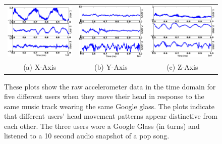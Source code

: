 \begin{figure}[t]
\begin{center}
\begin{tabular}{ccc}
\includegraphics [width=.33\linewidth]{figure/raw_x.eps}&
\includegraphics [width=.33\linewidth]{figure/raw_y.eps}&
\includegraphics [width=.33\linewidth]{figure/raw_z.eps}\\
(a) X-Axis & (b) Y-Axis & (c) Z-Axis \\
\end{tabular}

\end{center}
\caption{\label{fig:raw} These plots show the raw accelerometer data in the
time domain for five different users when they move their head in response to
the same music track wearing the same Google glass. The plots
indicate that different users' head movement patterns appear distinctive from
each other. The three users wore a Google Glass (in turns) and listened to a
10 second audio snapshot of a pop song.}
\vspace{-2pt}
\end{figure}